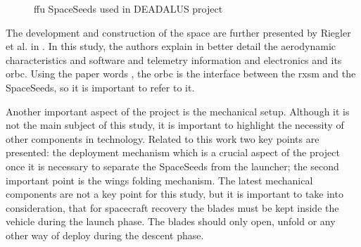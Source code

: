 \begin{figure}[!htb]
    \centering
    \hfill
    \caption{\gls{ffu} SpaceSeeds used in DEADALUS project}
    \label{fig:daedalus_ffu}
\end{figure}

The development and construction of the space are further presented by Riegler et al. in \cite{riegler_project_nodate}. In this study, the authors explain in better detail the aerodynamic characteristics and software and telemetry information and electronics and its \gls{orbc}. Using the paper words \cite{riegler_project_nodate}, the \gls{orbc} is the interface between the \gls{rxsm} and the SpaceSeeds, so it is important to refer to it. 

Another important aspect of the project is the mechanical setup. Although it is not the main subject of this study, it is important to highlight the necessity of other components in \cite{riegler_project_nodate} technology. Related to this work two key points are presented: the deployment mechanism which is a crucial aspect of the project once it is necessary to separate the SpaceSeeds from the launcher; the second important point is the wings folding mechanism. The latest mechanical components are not a key point for this study, but it is important to take into consideration, that for spacecraft recovery the blades must be kept inside the vehicle during the launch phase. The blades should only open, unfold or any other way of deploy during the descent phase.

